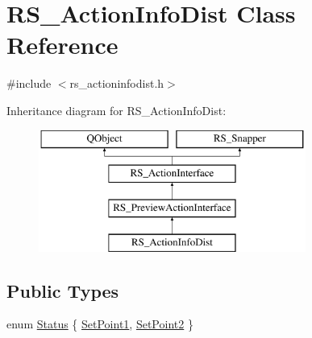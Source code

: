 \hypertarget{classRS__ActionInfoDist}{\section{R\-S\-\_\-\-Action\-Info\-Dist Class Reference}
\label{classRS__ActionInfoDist}
}


{\ttfamily \#include $<$rs\-\_\-actioninfodist.\-h$>$}

Inheritance diagram for R\-S\-\_\-\-Action\-Info\-Dist\-:\begin{figure}[H]
\begin{center}
\leavevmode
\includegraphics[height=4.000000cm]{classRS__ActionInfoDist}
\end{center}
\end{figure}
\subsection*{Public Types}
\begin{DoxyCompactItemize}
\item 
enum \hyperlink{classRS__ActionInfoDist_a5051f099fe74334a55df1d07bd577b6d}{Status} \{ \hyperlink{classRS__ActionInfoDist_a5051f099fe74334a55df1d07bd577b6dad11cd5eb69aad2b1d44b000572799cc0}{Set\-Point1}, 
\hyperlink{classRS__ActionInfoDist_a5051f099fe74334a55df1d07bd577b6daaea72c14c1abb29d5b997e9ae10289ca}{Set\-Point2}
 \}
\end{DoxyCompactItemize}
